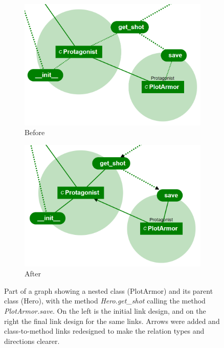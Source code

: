 \documentclass[a4paper,11pt,twoside]{article}
\theoremstyle{definition} %
\begin{document}
\begin{figure}
\centering
\begin{subfigure}{.5\textwidth}
  \centering
  \includegraphics[width=0.9\linewidth]{Subfigures/links-initial.PNG}
  \caption{Before}
  \label{fig:links-initial}
\end{subfigure}%
\begin{subfigure}{.5\textwidth}
  \centering
  \includegraphics[width=0.9\linewidth]{Subfigures/links-final.PNG}
  \caption{After}
  \label{fig:links-final}
\end{subfigure}
\caption{Part of a graph showing a nested class (PlotArmor) and its parent class (Hero), with the method \textit{Hero.get\_shot} calling the method \textit{PlotArmor.save}. On the left is the initial link design, and on the right the final link design for the same links. Arrows were added and class-to-method links redesigned to make the relation types and directions clearer.}
\label{fig:linkComparison}
\end{figure}
\end{document}
